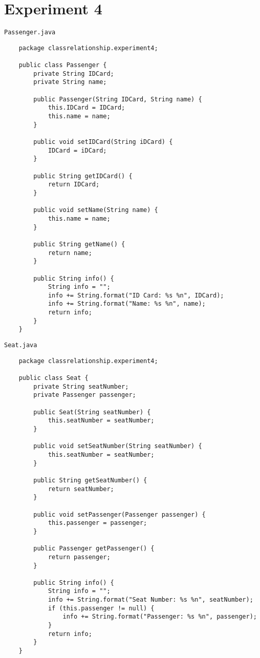 \documentclass[12pt,titlepage]{article}
\begin{document}
\newpage
\section{Experiment 4}
\texttt{Passenger.java}
\begin{verbatim}
    package classrelationship.experiment4;

    public class Passenger {
        private String IDCard;
        private String name;

        public Passenger(String IDCard, String name) {
            this.IDCard = IDCard;
            this.name = name;
        }

        public void setIDCard(String iDCard) {
            IDCard = iDCard;
        }

        public String getIDCard() {
            return IDCard;
        }

        public void setName(String name) {
            this.name = name;
        }

        public String getName() {
            return name;
        }

        public String info() {
            String info = "";
            info += String.format("ID Card: %s %n", IDCard);
            info += String.format("Name: %s %n", name);
            return info;
        }
    }
\end{verbatim}
\texttt{Seat.java}
\begin{verbatim}
    package classrelationship.experiment4;

    public class Seat {
        private String seatNumber;
        private Passenger passenger;

        public Seat(String seatNumber) {
            this.seatNumber = seatNumber;
        }

        public void setSeatNumber(String seatNumber) {
            this.seatNumber = seatNumber;
        }

        public String getSeatNumber() {
            return seatNumber;
        }

        public void setPassenger(Passenger passenger) {
            this.passenger = passenger;
        }

        public Passenger getPassenger() {
            return passenger;
        }

        public String info() {
            String info = "";
            info += String.format("Seat Number: %s %n", seatNumber);
            if (this.passenger != null) {
                info += String.format("Passenger: %s %n", passenger);
            }
            return info;
        }
    }
\end{verbatim}
\end{document}
